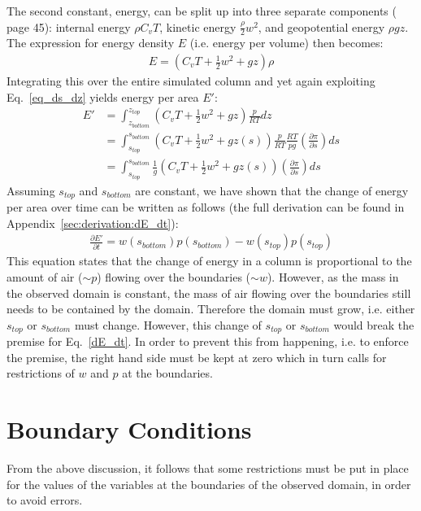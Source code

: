 \noindent
The second constant, energy, can be split up into three separate components (\cite{vallis2017atmospheric} page 45): internal energy $\rho C_vT$, kinetic energy $\frac{\rho}{2}w^2$, and geopotential energy $\rho gz$.
The expression for energy density $E$ (i.e. energy per volume) then becomes:
\begin{align*}
E = (C_vT+\frac{1}{2}w^2 + gz)\rho
\end{align*}
Integrating this over the entire simulated column and yet again exploiting Eq.~\ref{eq_ds_dz} yields energy per area $E'$:
\begin{align}
E' &= \int_{z_{bottom}}^{z_{top}} (C_vT+\frac{1}{2}w^2 + gz)\frac{p}{RT} dz\nonumber\\
&=  \int_{s_{top}}^{s_{bottom}} (C_vT+\frac{1}{2}w^2 + gz(s))\frac{p}{RT}\frac{RT}{pg} \left( \frac{\partial \pi}{\partial s} \right) ds\nonumber\\
&=  \int_{s_{top}}^{s_{bottom}} \frac{1}{g}(C_vT+\frac{1}{2}w^2 + gz(s)) \left( \frac{\partial \pi}{\partial s} \right) ds\label{eq_energy}
\end{align}
Assuming $s_{top}$ and $s_{bottom}$ are constant, we have shown that the change of energy per area over time can be written as follows (the full derivation can be found in Appendix~\ref{sec:derivation:dE_dt}):
\begin{align}\label{dE_dt}
\frac{\partial E'}{\partial t} = w(s_{bottom})p(s_{bottom})-w(s_{top})p(s_{top})
\end{align}
This equation states that the change of energy in a column is proportional to the amount of air ($\sim p$) flowing over the boundaries ($\sim w$).
However, as the mass in the observed domain is constant, the mass of air flowing over the boundaries still needs to be contained by the domain.
Therefore the domain must grow, i.e. either $s_{top}$ or $s_{bottom}$ must change.
However, this change of $s_{top}$ or $s_{bottom}$ would break the premise for Eq.~\ref{dE_dt}.
In order to prevent this from happening, i.e. to enforce the premise, the right hand side must be kept at zero which in turn calls for restrictions of $w$ and $p$ at the boundaries.

\section{Boundary Conditions}\label{sec:boundary}
From the above discussion, it follows that some restrictions must be put in place for the values of the variables at the boundaries of the observed domain, in order to avoid errors.
